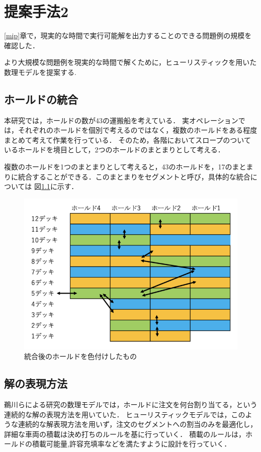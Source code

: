 \chapter{提案手法2}\label{method2}
\ref{mip}章で，現実的な時間で実行可能解を出力することのできる問題例の規模を確認した．

より大規模な問題例を現実的な時間で解くために，ヒューリスティックを用いた数理モデルを提案する.

\section{ホールドの統合}
本研究では，ホールドの数が43の運搬船を考えている．
実オペレーションでは，それぞれのホールドを個別で考えるのではなく，複数のホールドをある程度まとめて考えて作業を行っている．
そのため，各階においてスロープのついているホールドを境目として，2つのホールドのまとまりとして考える．

複数のホールドを1つのまとまりとして考えると，43のホールドを，17のまとまりに統合することができる．このまとまりをセグメントと呼び，具体的な統合については
図\ref{fig1}に示す．\\

\begin{figure}[H]
 \centering
 \includegraphics[slace=0.2]{segment.png}
 \caption{統合後のホールドを色付けしたもの}
 \label{fig1}
\end{figure}



\section{解の表現方法}
鵜川らによる研究の数理モデル\cite{ukawa}では，ホールドに注文を何台割り当てる，という連続的な解の表現方法を用いていた．
ヒューリスティックモデルでは，このような連続的な解表現方法を用いず，注文のセグメントへの割当のみを最適化し，詳細な車両の積載は決め打ちのルールを基に行っていく．
積載のルールは，ホールドの積載可能量,許容充填率などを満たすように設計を行っていく．

